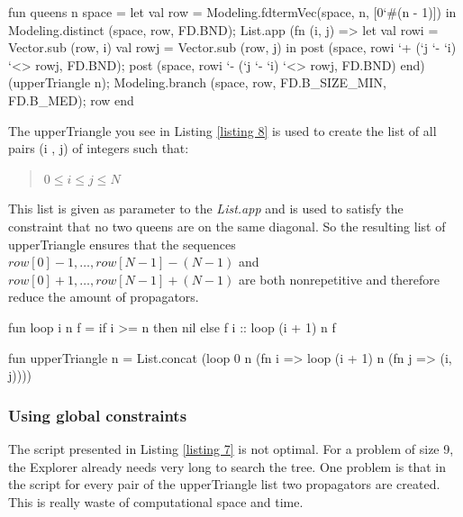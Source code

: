 \documentclass[a4paper,halfparskip]{scrartcl}
\begin{document}
\begin{myverbatim}
fun queens n space =
   let
      val row = Modeling.fdtermVec(space, n, [0`#(n - 1)])
   in
      Modeling.distinct (space, row, FD.BND);
      List.app (fn (i, j) =>
         let
            val rowi = Vector.sub (row, i)
            val rowj = Vector.sub (row, j)
         in
            post (space, rowi `+ (`j `- `i) `<> rowj, FD.BND);
            post (space, rowi `- (`j `- `i) `<> rowj, FD.BND)
         end) (upperTriangle n);
      Modeling.branch (space, row, FD.B_SIZE_MIN, FD.B_MED);
      row
   end
\end{myverbatim}



The  upperTriangle you see in Listing \ref{listing 8} is used
to create the list of all pairs (i , j) of integers such that:
\begin{quote}
$ 0 \leq i \le j \le N $
\end{quote}  
This list is given as parameter to the \emph{List.app}  and
is used to satisfy the constraint that no two queens are on the
same diagonal. So the resulting list of upperTriangle ensures
that the sequences $ row[ 0 ] - 1, \ldots, row[ N - 1 ] - (N - 1)  $ and
$ row[ 0 ] + 1, \ldots, row[ N - 1] + (N - 1) $ are both
nonrepetitive and therefore reduce the amount of propagators.
\begin{myverbatim}
fun loop i n f = if i >= n then nil else f i :: loop (i + 1) n f

fun upperTriangle n =
   List.concat (loop 0 n 
               (fn i => loop (i + 1) n (fn j => (i, j))))

\end{myverbatim}

\subsubsection{Using global constraints}
The script presented in Listing \ref{listing 7} is not optimal.
For a problem of size 9, the Explorer already needs very long to
search the tree. One problem is that in the script for every
pair of the upperTriangle list two propagators are created. This
is really waste of computational space and time.
\end{document}

